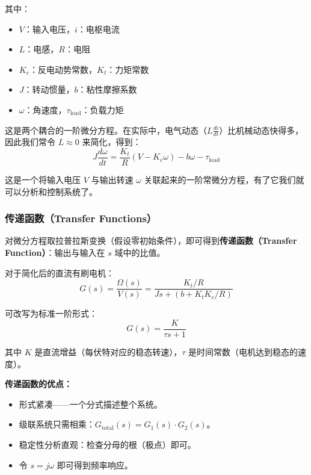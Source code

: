 其中：
\begin{itemize}[nosep]
    \item $V$：输入电压，$i$：电枢电流
    \item $L$：电感，$R$：电阻
    \item $K_e$：反电动势常数，$K_t$：力矩常数
    \item $J$：转动惯量，$b$：粘性摩擦系数
    \item $\omega$：角速度，$\tau_{\text{load}}$：负载力矩
\end{itemize}

这是两个耦合的一阶微分方程。在实际中，电气动态（$L \frac{di}{dt}$）比机械动态快得多，因此我们常令 $L \approx 0$ 来简化，得到：
\begin{equation}
J \frac{d\omega}{dt} = \frac{K_t}{R}(V - K_e \omega) - b\omega - \tau_{\text{load}}
\end{equation}

这是一个将输入电压 $V$ 与输出转速 $\omega$ 关联起来的一阶常微分方程，有了它我们就可以分析和控制系统了。

\subsubsection{传递函数（Transfer Functions）}

对微分方程取拉普拉斯变换（假设零初始条件），即可得到\textbf{传递函数（Transfer Function）}：输出与输入在 $s$ 域中的比值。

对于简化后的直流有刷电机：
\begin{equation}
G(s) = \frac{\Omega(s)}{V(s)} = \frac{K_t / R}{Js + (b + K_t K_e / R)}
\end{equation}

可改写为标准一阶形式：
\begin{equation}
G(s) = \frac{K}{\tau s + 1}
\end{equation}

其中 $K$ 是直流增益（每伏特对应的稳态转速），$\tau$ 是时间常数（电机达到稳态的速度）。

\textbf{传递函数的优点：}
\begin{itemize}
    \item 形式紧凑——一个分式描述整个系统。
    \item 级联系统只需相乘：$G_{\text{total}}(s) = G_1(s) \cdot G_2(s)$。
    \item 稳定性分析直观：检查分母的根（极点）即可。
    \item 令 $s = j\omega$ 即可得到频率响应。
\end{itemize}


